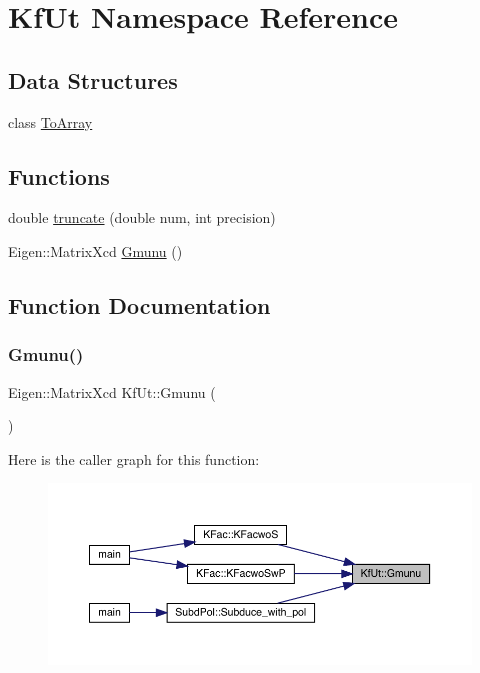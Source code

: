 \hypertarget{namespaceKfUt}{}\section{Kf\+Ut Namespace Reference}
\label{namespaceKfUt}
\subsection*{Data Structures}
\begin{DoxyCompactItemize}
\item 
class \mbox{\hyperlink{classKfUt_1_1ToArray}{To\+Array}}
\end{DoxyCompactItemize}
\subsection*{Functions}
\begin{DoxyCompactItemize}
\item 
double \mbox{\hyperlink{namespaceKfUt_a155e8db38d770e216ef19d9938394c17}{truncate}} (double num, int precision)
\item 
Eigen\+::\+Matrix\+Xcd \mbox{\hyperlink{namespaceKfUt_ac090f8c3b57fe35c462bd3c3c2d8f08b}{Gmunu}} ()
\end{DoxyCompactItemize}


\subsection{Function Documentation}
\mbox{\label{namespaceKfUt_ac090f8c3b57fe35c462bd3c3c2d8f08b}} 
\subsubsection{\texorpdfstring{Gmunu()}{Gmunu()}}
{\footnotesize\ttfamily Eigen\+::\+Matrix\+Xcd Kf\+Ut\+::\+Gmunu (\begin{DoxyParamCaption}{ }\end{DoxyParamCaption})}

Here is the caller graph for this function\+:\nopagebreak
\begin{figure}[H]
\begin{center}
\leavevmode
\includegraphics[width=350pt]{d8/da5/namespaceKfUt_ac090f8c3b57fe35c462bd3c3c2d8f08b_icgraph}
\end{center}
\end{figure}
\mbox{\label{namespaceKfUt_a155e8db38d770e216ef19d9938394c17}} 
